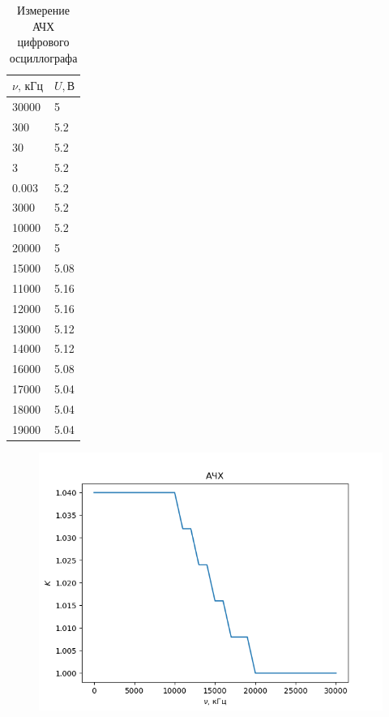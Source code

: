 \begin{table}[!ht]
    \centering
    \caption{Измерение АЧХ цифрового осциллографа}
    \begin{tabular}{|l|l|}
    \hline
        $\nu,\,\text{кГц}$ & $U,\text{В}$ \\ \hline
        30000 & 5 \\ \hline
        300 & 5.2 \\ \hline
        30 & 5.2 \\ \hline
        3 & 5.2 \\ \hline
        0.003 & 5.2 \\ \hline
        3000 & 5.2 \\ \hline
        10000 & 5.2 \\ \hline
        20000 & 5 \\ \hline
        15000 & 5.08 \\ \hline
        11000 & 5.16 \\ \hline
        12000 & 5.16 \\ \hline
        13000 & 5.12 \\ \hline
        14000 & 5.12 \\ \hline
        16000 & 5.08 \\ \hline
        17000 & 5.04 \\ \hline
        18000 & 5.04 \\ \hline
        19000 & 5.04 \\ \hline
    \end{tabular}
\end{table}

\begin{figure}[ht!]\centering\includegraphics[width=0.8\linewidth]{img/ach}\end{figure}

